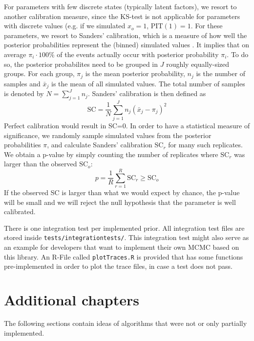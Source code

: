 \documentclass[a4paper,11pt]{article}
\begin{document}
For parameters with few discrete states (typically latent factors), we resort to another calibration measure, since the KS-test is not applicable for parameters with discrete values (e.g. if we simulated $x_o = 1$, $\mbox{PIT}(1) = 1$. For these parameters, we resort to Sanders' calibration, which is a measure of how well the posterior probabilities represent the (binned) simulated values \citep{Held2014}. It implies that on average $\pi_i \cdot 100$\% of the events actually occur with posterior probability $\pi_i$. To do so, the posterior probabilites need to be grouped in $J$ roughly equally-sized groups. For each group, $\pi_j$ is the mean posterior probability, $n_j$ is the number of samples and $\bar{x}_j$ is the mean of all simulated values. The total number of samples is denoted by $N = \sum_{j=1}^J n_j$. Sanders' calibration is then defined as
\begin{equation*}
 \mbox{SC} = \frac{1}{N}\sum_{j=1}^J n_j (\bar{x}_j - \pi_j)^2
\end{equation*}
Perfect calibration would result in SC=0. In order to have a statistical measure of significance, we randomly sample simulated values from the posterior probabilities $\pi$, and calculate Sanders' calibration $\mbox{SC}_{r}$ for many such replicates. We obtain a p-value by simply counting the number of replicates where $\mbox{SC}_{r}$ was larger than the observed $\mbox{SC}_{o}$:
\begin{equation*}
 p = \frac{1}{R}\sum_{r=1}^R \mbox{SC}_{r} \geq \mbox{SC}_{o}
\end{equation*}
If the observed SC is larger than what we would expect by chance, the p-value will be small and we will reject the null hypothesis that the parameter is well calibrated.

There is one integration test per implemented prior. All integration test files are stored inside \texttt{tests/integrationtests/}. This integration test might also serve as an example for developers that want to implement their own MCMC based on this library. An R-File called \texttt{plotTraces.R} is provided that has some functions pre-implemented in order to plot the trace files, in case a test does not pass.

\section{Additional chapters}

The following sections contain ideas of algorithms that were not or only partially implemented.
\end{document}
